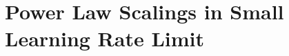 \documentclass{article} %
\begin{document}


\section{Power Law Scalings in Small Learning Rate Limit}\label{Power_law_appendix}
\end{document}
